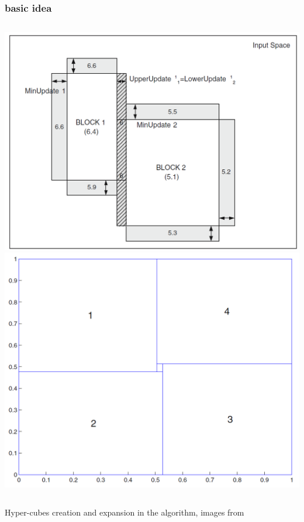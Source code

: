 \documentclass[presentation]{beamer}
\begin{document}
\begin{frame}[allowframebreaks]
\frametitle{\iter basic idea}
	\begin{columns}[t]
			\centering
			\includegraphics[width = \columnwidth]{img/cubes.png}
			\centering
			\includegraphics[width = \columnwidth]{img/iter.png}
	\end{columns}
	\centering
	Hyper-cubes creation and expansion in the \iter algorithm, images from 
	


\end{frame}
\end{document}
